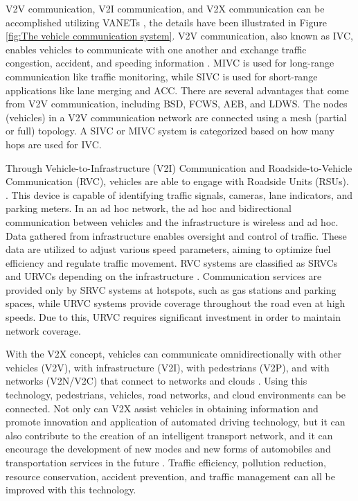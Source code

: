 \documentclass[a4paper,12pt]{article}
\begin{document}
\hspace{5mm} V2V communication, V2I communication, and V2X communication can be accomplished utilizing VANETs \cite{article24}, the details have been illustrated in Figure \ref{fig:The vehicle communication system}. V2V communication, also known as IVC, enables vehicles to communicate with one another and exchange traffic congestion, accident, and speeding information \cite{article24}. MIVC is used for long-range communication like traffic monitoring, while SIVC is used for short-range applications like lane merging and ACC. There are several advantages that come from V2V communication, including BSD, FCWS, AEB, and LDWS. The nodes (vehicles) in a V2V communication network are connected using a mesh (partial or full) topology. A SIVC or MIVC system is categorized based on how many hops are used for IVC.

\hspace{5mm} Through Vehicle-to-Infrastructure (V2I) Communication and Roadside-to-Vehicle Communication (RVC), vehicles are able to engage with Roadside Units (RSUs). \cite{article24}. This device is capable of identifying traffic signals, cameras, lane indicators, and parking meters. In an ad hoc network, the ad hoc and bidirectional communication between vehicles and the infrastructure is wireless and ad hoc. Data gathered from infrastructure enables oversight and control of traffic. These data are utilized to adjust various speed parameters, aiming to optimize fuel efficiency and regulate traffic movement. RVC systems are classified as SRVCs and URVCs depending on the infrastructure \cite{article24}. Communication services are provided only by SRVC systems at hotspots, such as gas stations and parking spaces, while URVC systems provide coverage throughout the road even at high speeds. Due to this, URVC requires significant investment in order to maintain network coverage.

\hspace{5mm} With the V2X concept, vehicles can communicate omnidirectionally with other vehicles (V2V), with infrastructure (V2I), with pedestrians (V2P), and with networks (V2N/V2C) that connect to networks and clouds \cite{article25}. Using this technology, pedestrians, vehicles, road networks, and cloud environments can be connected. Not only can V2X assist vehicles in obtaining information and promote innovation and application of automated driving technology, but it can also contribute to the creation of an intelligent transport network, and it can encourage the development of new modes and new forms of automobiles and transportation services in the future \cite{article25}. Traffic efficiency, pollution reduction, resource conservation, accident prevention, and traffic management can all be improved with this technology.
\end{document}
